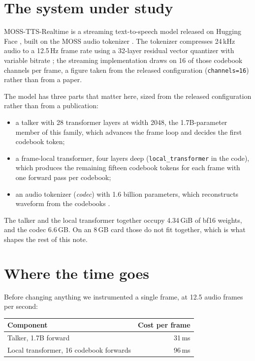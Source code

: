 \documentclass[11pt]{article}
\begin{document}
\section{The system under study}

MOSS-TTS-Realtime is a streaming text-to-speech model released on Hugging Face \cite{mossrealtimecard}, built on the
MOSS audio tokenizer \cite{mosstokenizer}. The tokenizer compresses 24\,kHz audio to a 12.5\,Hz frame rate using a
32-layer residual vector quantizer with variable bitrate \cite{mosstokenizer}; the streaming implementation draws on
16 of those codebook channels per frame, a figure taken from the released configuration
(\texttt{channels=16}) rather than from a paper.

The model has three parts that matter here, sized from the released configuration rather than from a publication:

\begin{itemize}
\item a talker with 28 transformer layers at width 2048, the 1.7B-parameter member of this family, which advances the
frame loop and decides the first codebook token;
\item a frame-local transformer, four layers deep (\texttt{local\_transformer} in the code), which produces the
remaining fifteen codebook tokens for each frame with one forward pass per codebook;
\item an audio tokenizer (\emph{codec}) with 1.6 billion parameters, which reconstructs waveform from the codebooks
\cite{mosstokenizer}.
\end{itemize}

The talker and the local transformer together occupy 4.34\,GiB of bf16 weights, and the codec 6.6\,GB. On an
8\,GB card those do not fit together, which is what shapes the rest of this note.

\section{Where the time goes}

Before changing anything we instrumented a single frame, at 12.5 audio frames per second:

\begin{center}
\begin{tabular}{lr}
\toprule
Component & Cost per frame \\
\midrule
Talker, 1.7B forward & 31\,ms \\
Local transformer, 16 codebook forwards & 96\,ms \\
\bottomrule
\end{tabular}
\end{center}
\end{document}
